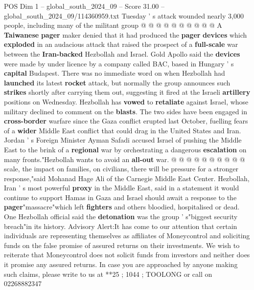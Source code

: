 \begin{textsample}{POS Dim 1 – global\_south\_2024\_09 – Score 31.00 – global\_south\_2024\_09/114360959.txt}
Tuesday ' s attack wounded nearly 3,000 people, including many of the militant group @ @ @ @ @ @ @ @ @ @ A \textbf{Taiwanese} \textbf{pager} maker denied that it had produced the \textbf{pager} \textbf{devices} which \textbf{exploded} in an audacious attack that raised the prospect of a \textbf{full-scale} war between the \textbf{Iran-backed} Hezbollah and Israel.
Gold Apollo said the \textbf{devices} were made by under licence by a company called BAC, based in Hungary ' s \textbf{capital} Budapest.
There was no immediate word on when Hezbollah had \textbf{launched} its latest \textbf{rocket} attack, but normally the group announces such \textbf{strikes} shortly after carrying them out, suggesting it fired at the Israeli \textbf{artillery} positions on Wednesday.
Hezbollah has \textbf{vowed} to \textbf{retaliate} against Israel, whose military declined to comment on the \textbf{blasts}.
The two sides have been engaged in \textbf{cross-border} warfare since the Gaza conflict erupted last October, fuelling fears of a \textbf{wider} Middle East conflict that could drag in the United States and Iran.
Jordan ' s Foreign Minister Ayman Safadi accused Israel of pushing the Middle East to the brink of a \textbf{regional} war by orchestrating a dangerous \textbf{escalation} on many fronts."Hezbollah wants to avoid an \textbf{all-out} war. @ @ @ @ @ @ @ @ @ @ scale, the impact on families, on civilians, there will be pressure for a stronger response,"said Mohanad Hage Ali of the Carnegie Middle East Center.
Hezbollah, Iran ' s most powerful \textbf{proxy} in the Middle East, said in a statement it would continue to support Hamas in Gaza and Israel should await a response to the \textbf{pager}"massacre"which left \textbf{fighters} and others bloodied, hospitalised or dead.
One Hezbollah official said the \textbf{detonation} was the group ' s"biggest security breach"in its history.
Advisory Alert:It has come to our attention that certain individuals are representing themselves as affiliates of Moneycontrol and soliciting funds on the false promise of assured returns on their investments.
We wish to reiterate that Moneycontrol does not solicit funds from investors and neither does it promise any assured returns.
In case you are approached by anyone making such claims, please write to us at **25 ; 1044 ; TOOLONG or call on 02268882347

\end{textsample}
